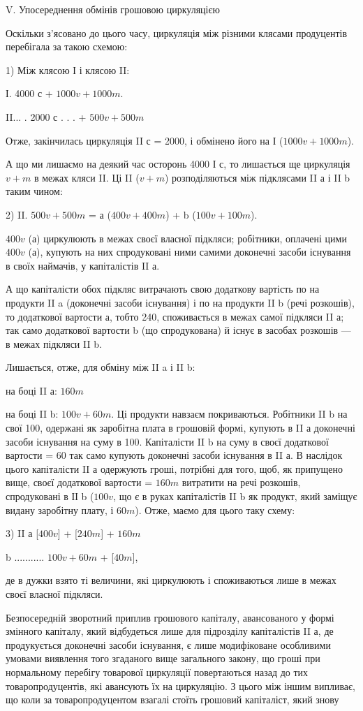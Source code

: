 V. Упосереднення обмінів грошовою циркуляцією

Оскільки з’ясовано до цього часу, циркуляція між різними клясами
продуцентів перебігала за такою схемою:

1) Між клясою І і клясою II:

І. 4000 с + $1000 v + 1000 m$.

II... .    2000 с . . . + $500 v + 500 m$

Отже, закінчилась циркуляція II с = 2000, і обмінено його на
І ($1000 v + 1000 m$).

А що ми лишаємо на деякий час осторонь 4000 І с, то лишається ще
циркуляція $v + m$ в межах кляси II. Ці II ($v + m$) розподіляються між
підклясами II а і II b таким чином:

2) II. $500 v + 500 m$ = а ($400 v + 400 m$) + b ($100 v + 100 m$).

$400 v$ (а) циркулюють в межах своєї власної підкляси; робітники,
оплачені цими $400 v$ (а), купують на них спродуковані ними самими доконечні
засоби існування в своїх наймачів, у капіталістів II а.

А що капіталісти обох підкляс витрачають свою додаткову вартість
по  на продукти II a (доконечні засоби існування) і по  на продукти
II b (речі розкошів), то  додаткової вартости а, тобто 240, споживається
в межах самої підкляси II а; так само  додаткової вартости b (що спродукована)
й існує в засобах розкошів — в межах підкляси II b.

Лишається, отже, для обміну між II a і II b:

на боці II а: $160 m$

на боці II b: $100 v + 60 m$. Ці продукти навзаєм покриваються. Робітники
II b на свої 100, одержані як заробітна плата в грошовій формі,
купують в II а доконечні засоби існування на суму в 100. Капіталісти
II b на суму в  своєї додаткової вартости = 60 так само купують
доконечні засоби існування в II а. В наслідок цього капіталісти II а одержують
гроші, потрібні для того, щоб, як припущено вище,  своєї
додаткової вартости = $160 m$ витратити на речі розкошів, спродуковані
в ІІ b ($100 v$, що є в руках капіталістів II b як продукт, який заміщує
видану заробітну плату, і $60 m$). Отже, маємо для цього таку схему:

3) II а [$400 v$] + [$240 m$] + $160 m$

b ........... $100 v + 60 m$ + [$40 m$],

де в дужки взято ті величини, які циркулюють і споживаються лише в
межах своєї власної підкляси.

Безпосередній зворотний приплив грошового капіталу, авансованого у
формі змінного капіталу, який відбудеться лише для підрозділу капіталістів
II а, де продукується доконечні засоби існування, є лише модифіковане
особливими умовами виявлення того згаданого вище
загального закону, що гроші при нормальному перебігу товарової
циркуляції повертаються назад до тих товаропродуцентів, які авансують
їх на циркуляцію. З цього між іншим випливає, що коли за
товаропродуцентом взагалі стоїть грошовий капіталіст, який знову
\parbreak{}  %
